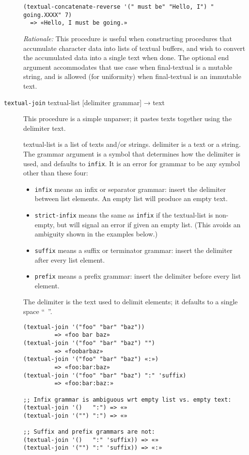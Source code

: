 \begin{description}
\begin{verbatim}
(textual-concatenate-reverse '(" must be" "Hello, I") " going.XXXX" 7)
  => «Hello, I must be going.»
\end{verbatim}

\emph{Rationale:} This procedure is useful when constructing procedures
that accumulate character data into lists of textual buffers, and wish
to convert the accumulated data into a single text when done. The
optional end argument accommodates that use case when final-textual is a
mutable string, and is allowed (for uniformity) when final-textual is an
immutable text.
\item[ \href{}{} \texttt{textual-join} textual-list {[}delimiter
grammar{]} → text ]
This procedure is a simple unparser; it pastes texts together using the
delimiter text.

textual-list is a list of texts and/or strings. delimiter is a text or a
string. The grammar argument is a symbol that determines how the
delimiter is used, and defaults to \texttt{\textquotesingle{}infix}. It
is an error for grammar to be any symbol other than these four:

\begin{itemize}
\tightlist
\item
  \texttt{\textquotesingle{}infix} means an infix or separator grammar:
  insert the delimiter between list elements. An empty list will produce
  an empty text.
\item
  \texttt{\textquotesingle{}strict-infix} means the same as
  \texttt{\textquotesingle{}infix} if the textual-list is non-empty, but
  will signal an error if given an empty list. (This avoids an ambiguity
  shown in the examples below.)
\item
  \texttt{\textquotesingle{}suffix} means a suffix or terminator
  grammar: insert the delimiter after every list element.
\item
  \texttt{\textquotesingle{}prefix} means a prefix grammar: insert the
  delimiter before every list element.
\end{itemize}

The delimiter is the text used to delimit elements; it defaults to a
single space ``~''.

\begin{verbatim}
(textual-join '("foo" "bar" "baz"))
         => «foo bar baz»
(textual-join '("foo" "bar" "baz") "")
         => «foobarbaz»
(textual-join '("foo" "bar" "baz") «:»)
         => «foo:bar:baz»
(textual-join '("foo" "bar" "baz") ":" 'suffix)
         => «foo:bar:baz:»

;; Infix grammar is ambiguous wrt empty list vs. empty text:
(textual-join '()   ":") => «»
(textual-join '("") ":") => «»

;; Suffix and prefix grammars are not:
(textual-join '()   ":" 'suffix)) => «»
(textual-join '("") ":" 'suffix)) => «:»
\end{verbatim}
\end{description}

